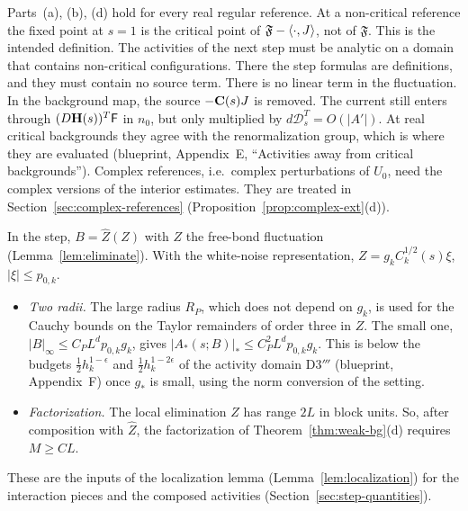 \begin{remark}\label{rem:weak-bg-noncritical}
Parts~(a), (b), (d) hold for every real regular reference. At a non-critical reference the fixed point at $s=1$ is the critical point of $\mathfrak F-\langle \cdot,J\rangle$, not of $\mathfrak F$. This is the intended definition. The activities of the next step must be analytic on a domain that contains non-critical configurations. There the step formulas are definitions, and they must contain no source term. There is no linear term in the fluctuation. In the background map, the source $-\mathbf C(s)J$ is removed. The current still enters through $(D\mathbf H(s))^T\mathsf F$ in $n_0$, but only multiplied by $d\mathcal D_s^T=O(|A'|)$. At real critical backgrounds they agree with the renormalization group, which is where they are evaluated (blueprint, Appendix~E, ``Activities away from critical backgrounds''). Complex references, i.e.\ complex perturbations of $U_0$, need the complex versions of the interior estimates. They are treated in Section~\ref{sec:complex-references} (Proposition~\ref{prop:complex-ext}(d)).
\end{remark}

\begin{remark}
In the step, $B=\hat Z(Z)$ with $Z$ the free-bond fluctuation (Lemma~\ref{lem:eliminate}). With the white-noise representation, $Z=g_kC_k^{1/2}(s)\xi$, $|\xi|\le p_{0,k}$.
\begin{itemize}
\item \emph{Two radii.} The large radius $R_P$, which does not depend on $g_k$, is used for the Cauchy bounds on the Taylor remainders of order three in $Z$. The small one, $|B|_\infty\le C_PL^dp_{0,k}g_k$, gives $|A_*(s;B)|_*\le C_P^2L^dp_{0,k}g_k$. This is below the budgets $\frac12h_k^{1-\epsilon}$ and $\frac12h_k^{1-2\epsilon}$ of the activity domain D3$'''$ (blueprint, Appendix~F) once $g_*$ is small, using the norm conversion of the setting.
\item \emph{Factorization.} The local elimination $\hat Z$ has range $2L$ in block units. So, after composition with $\hat Z$, the factorization of Theorem~\ref{thm:weak-bg}(d) requires $M\ge CL$.
\end{itemize}
These are the inputs of the localization lemma (Lemma~\ref{lem:localization}) for the interaction pieces and the composed activities (Section~\ref{sec:step-quantities}).
\end{remark}
